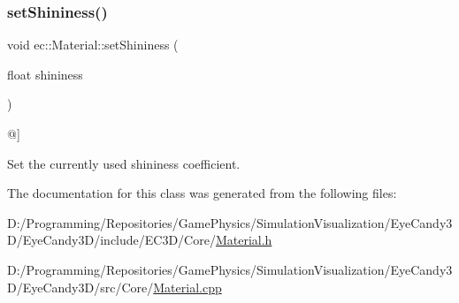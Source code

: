 \subsubsection{\texorpdfstring{set\+Shininess()}{setShininess()}}
{\footnotesize\ttfamily void ec\+::\+Material\+::set\+Shininess (\begin{DoxyParamCaption}\item[{float}]{shininess }\end{DoxyParamCaption})}



@\mbox{]} 

Set the currently used shininess coefficient. 

The documentation for this class was generated from the following files\+:\begin{DoxyCompactItemize}
\item 
D\+:/\+Programming/\+Repositories/\+Game\+Physics/\+Simulation\+Visualization/\+Eye\+Candy3\+D/\+Eye\+Candy3\+D/include/\+E\+C3\+D/\+Core/\mbox{\hyperlink{_material_8h}{Material.\+h}}\item 
D\+:/\+Programming/\+Repositories/\+Game\+Physics/\+Simulation\+Visualization/\+Eye\+Candy3\+D/\+Eye\+Candy3\+D/src/\+Core/\mbox{\hyperlink{_material_8cpp}{Material.\+cpp}}\end{DoxyCompactItemize}
